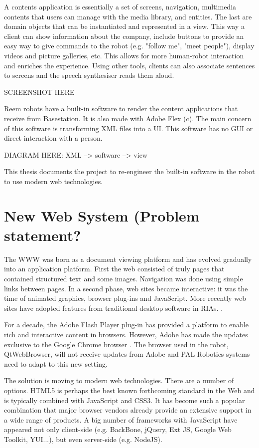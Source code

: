 A contents application is essentially a set of screens, navigation, multimedia contents that users can manage with the media library, and entities. 
The last are domain objects that can be instantiated and represented in a view. 
This way a client can show information about the company, include buttons to provide an easy way to give commands to the robot (e.g. "follow me", "meet people"), display videos and picture galleries, etc.
This allows for more human-robot interaction and enriches the experience. 
Using other tools, clients can also associate sentences to screens and the speech synthesiser reads them aloud.

SCREENSHOT HERE

Reem robots have a built-in software to render the content applications that receive from Basestation. 
It is also made with Adobe Flex (c).
The main concern of this software is transforming \ac{XML} files into a \ac{UI}. 
This software has no \ac{GUI} or direct interaction with a person.

DIAGRAM HERE: XML --> software --> view

This thesis documents the project to re-engineer the built-in software in the robot to use modern web technologies.

\section{New Web System (Problem statement?}
The \ac{WWW} was born as a document viewing platform and has evolved gradually into an application platform. 
First the web consisted of truly pages that contained structured text and some images. 
Navigation was done using simple links between pages. 
In a second phase, web sites became interactive: 
it was the time of animated graphics, browser plug-ins and JavaScript. 
More recently web sites have adopted features from traditional desktop software in \acp{RIA}. \cite{Anttonen:2011}.

For a decade, the Adobe Flash Player plug-in has provided a platform to enable rich and interactive content in browsers.
However, Adobe has made the updates exclusive to the Google Chrome browser \cite{FlashRoadmap}. 
The browser used in the robot, QtWebBrowser, will not receive updates from Adobe and PAL Robotics systems need to adapt to this new setting. 

The solution is moving to modern web technologies.
There are a number of options. \ac{HTML5} is perhaps the best known forthcoming standard in the Web and is typically combined with JavaScript and \ac{CSS3}. 
It has become such a popular combination that major browser vendors already provide an extensive support in a wide range of products.
A big number of frameworks with JavaScript have appeared not only client-side (e.g. BackBone, jQuery, Ext JS, Google Web Toolkit, YUI...), but even server-side (e.g. NodeJS).

